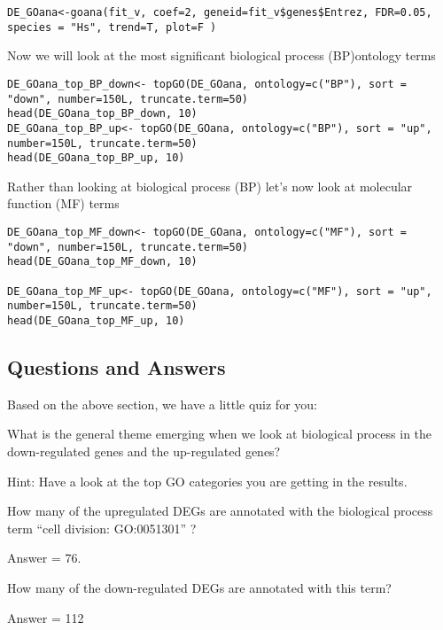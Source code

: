 \begin{Statistical tests used in Gene Ontology analysis}[style=multiline,labelindent=0cm,align=left,leftmargin=0.5cm]
\begin{steps}
\begin{lstlisting}
DE_GOana<-goana(fit_v, coef=2, geneid=fit_v$genes$Entrez, FDR=0.05, species = "Hs", trend=T, plot=F )
\end{lstlisting}
\end{steps}


Now we will look at the most significant biological process (BP)ontology terms 

\begin{steps}
\begin{lstlisting}
DE_GOana_top_BP_down<- topGO(DE_GOana, ontology=c("BP"), sort = "down", number=150L, truncate.term=50)
head(DE_GOana_top_BP_down, 10)
DE_GOana_top_BP_up<- topGO(DE_GOana, ontology=c("BP"), sort = "up", number=150L, truncate.term=50)
head(DE_GOana_top_BP_up, 10)
\end{lstlisting}
\end{steps}

Rather than looking at biological process (BP) let’s now look at molecular function (MF) terms

\begin{steps}
\begin{lstlisting}
DE_GOana_top_MF_down<- topGO(DE_GOana, ontology=c("MF"), sort = "down", number=150L, truncate.term=50)
head(DE_GOana_top_MF_down, 10)

DE_GOana_top_MF_up<- topGO(DE_GOana, ontology=c("MF"), sort = "up", number=150L, truncate.term=50)
head(DE_GOana_top_MF_up, 10)
\end{lstlisting}
\end{steps}

\subsection{Questions and Answers}
Based on the above section, we have a little quiz for you:



\begin{questions}
What is the general theme emerging when we look at biological process in the down-regulated genes and the up-regulated genes?
\begin{answer}
Hint: Have a look at the top GO categories you are getting in the results. 
\end{answer}

How many of the upregulated DEGs are annotated with the biological process term “cell division: GO:0051301” ? 
\begin{answer}
Answer = 76. 
\end{answer}
How many of the down-regulated DEGs are annotated with this term? 
\begin{answer}
Answer = 112
\end{answer}
\end{questions}


\end{Statistical tests used in Gene Ontology analysis}
